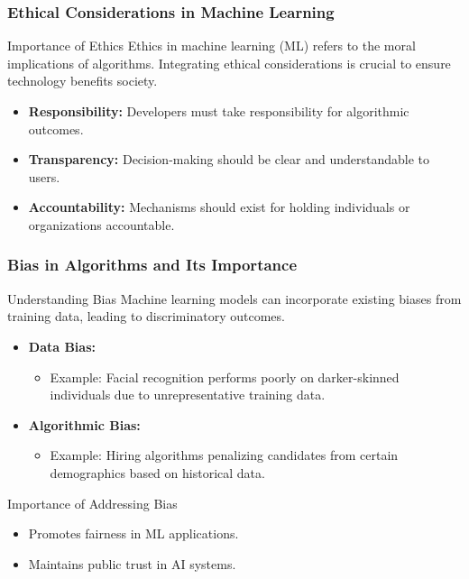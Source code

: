 \documentclass[aspectratio=169]{beamer}
\begin{document}
\begin{frame}
    \frametitle{Ethical Considerations in Machine Learning}
    \begin{block}{Importance of Ethics}
        Ethics in machine learning (ML) refers to the moral implications of algorithms. 
        Integrating ethical considerations is crucial to ensure technology benefits society.
    \end{block}
    \begin{itemize}
        \item \textbf{Responsibility:} Developers must take responsibility for algorithmic outcomes.
        \item \textbf{Transparency:} Decision-making should be clear and understandable to users.
        \item \textbf{Accountability:} Mechanisms should exist for holding individuals or organizations accountable.
    \end{itemize}
\end{frame}

\begin{frame}
    \frametitle{Bias in Algorithms and Its Importance}
    \begin{block}{Understanding Bias}
        Machine learning models can incorporate existing biases from training data, leading to discriminatory outcomes.
    \end{block}
    \begin{itemize}
        \item \textbf{Data Bias:} 
        \begin{itemize}
            \item Example: Facial recognition performs poorly on darker-skinned individuals due to unrepresentative training data.
        \end{itemize}
        \item \textbf{Algorithmic Bias:} 
        \begin{itemize}
            \item Example: Hiring algorithms penalizing candidates from certain demographics based on historical data.
        \end{itemize}
    \end{itemize}
    \begin{block}{Importance of Addressing Bias}
        \begin{itemize}
            \item Promotes fairness in ML applications.
            \item Maintains public trust in AI systems.
        \end{itemize}
    \end{block}
\end{frame}
\end{document}
